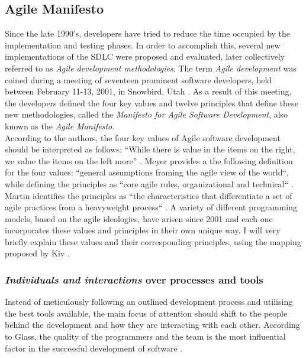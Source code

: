 
\subsection{Agile Manifesto}
Since the late 1990's, developers have tried to reduce the time occupied by the implementation and testing phases. In order to accomplish this, several new implementations of the SDLC were proposed and evaluated, later collectively referred to as \emph{Agile development methodologies}. The term \emph{Agile development} was coined during a meeting of seventeen prominent software developers, held between February 11-13, 2001, in Snowbird, Utah \cite{jimhighsmith2001}. As a result of this meeting, the developers defined the four key values and twelve principles that define these new methodologies, called the \emph{Manifesto for Agile Software Development}, also known as the \emph{Agile Manifesto}.\\

\noindent According to the authors, the four key values of Agile software development should be interpreted as follows: ``While there is value in the items on the right, we value the items on the left more'' \cite{beck2001agile}. Meyer provides a the following definition for the four values: ``general assumptions framing the agile view of the world``, while defining the principles as ``core agile rules, organizational and technical`` \cite[p.~2]{Meyer2014}. Martin identifies the principles as ``the characteristics that differentiate a set of agile practices from a heavyweight process`` \cite[p.~33]{martin2014}. A variety of different programming models, based on the agile ideologies, have arisen since 2001 and each one incorporates these values and principles in their own unique way. I will very briefly explain these values and their corresponding principles, using the mapping proposed by Kiv \cite[p.~12]{10.1007/978-3-030-03673-7_2}.

\subsubsection{\emph{Individuals and interactions} over processes and tools}\label{sssec:agilevalue-individuals}
Instead of meticulously following an outlined development process and utilising the best tools available, the main focus of attention should shift to the people behind the development and how they are interacting with each other. According to Glass, the quality of the programmers and the team is the most influential factor in the successful development of software \cite{glass2001agile}. 

